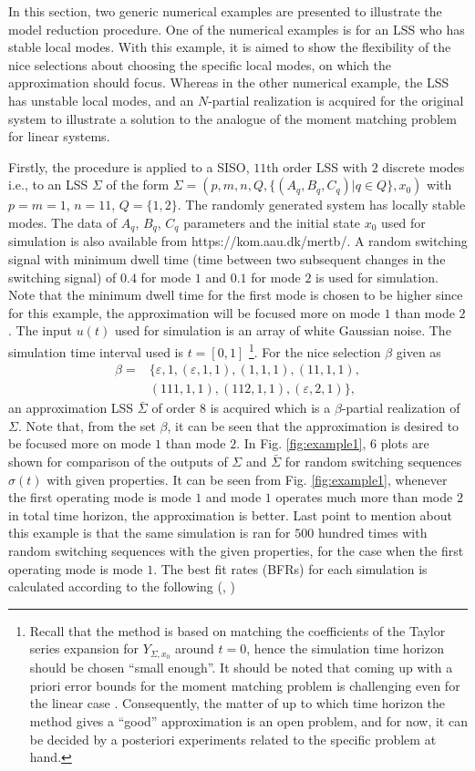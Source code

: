 \documentclass[journal]{IEEEtran}
\begin{document}
In this section, two generic numerical examples are presented to illustrate the model reduction procedure. One of the numerical examples is for an LSS who has stable local modes. With this example, it is aimed to show the flexibility of the nice selections about choosing the specific local modes, on which the approximation should focus. Whereas in the other numerical example, the LSS has unstable local modes, and an $N$-partial realization is acquired for the original system to illustrate a solution to the analogue of the moment matching problem for linear systems.

Firstly, the procedure is applied to a SISO, $11$th order LSS with $2$ discrete modes i.e., to an LSS $\Sigma$ of the form $\Sigma=(p,m,n,Q,\{(A_q,B_q,C_q)|q \in Q\},x_0)$ with $p=m=1$, $n=11$, $Q=\{1,2\}$. The randomly generated system has locally stable modes. The data of $A_q$, $B_q$, $C_q$ parameters and the initial state $x_0$ used for simulation is also available from https://kom.aau.dk/\texttildelow mertb/. A random switching signal with minimum dwell time (time between two subsequent changes in the switching signal) of $0.4$ for mode $1$ and $0.1$ for mode $2$ is used for simulation. Note that the minimum dwell time for the first mode is chosen to be higher since for this example, the approximation will be focused more on mode $1$ than mode $2$. The input $u(t)$ used for simulation is an array of white Gaussian noise. The simulation time interval used is $t=[0,1]$ \footnote{Recall that the method is based on matching the coefficients of the Taylor series expansion for $Y_{\Sigma,x_0}$ around $t=0$, hence the simulation time horizon should be chosen ``small enough''. It should be noted that coming up with a priori error bounds for the moment matching problem is challenging even for the linear case \cite{antoulas}. Consequently, the matter of up to which time horizon the method gives a ``good'' approximation is an open problem, and for now, it can be decided by a posteriori experiments related to the specific problem at hand.}. For the nice selection $\beta$ given as
\begin{align*}
	\beta= & \{ \varepsilon, 1, (\varepsilon,1,1), (1,1,1), (11,1,1), \\ 
	& (111,1,1), (112,1,1), (\varepsilon,2,1) \},
\end{align*}
an approximation LSS $\bar{\Sigma}$ of order $8$ is acquired which is a $\beta$-partial realization of $\Sigma$. Note that, from the set $\beta$, it can be seen that the approximation is desired to be focused more on mode $1$ than mode $2$. In Fig. \ref{fig:example1}, $6$ plots are shown for comparison of the outputs of $\Sigma$ and $\bar{\Sigma}$ for random switching sequences $\sigma(t)$ with given properties. It can be seen from Fig. \ref{fig:example1}, whenever the first operating mode is mode $1$ and mode $1$ operates much more than mode $2$ in total time horizon, the approximation is better. Last point to mention about this example is that the same simulation is ran for $500$ hundred times with random switching sequences with the given properties, for the case when the first operating mode is mode $1$. The best fit rates (BFRs) for each simulation is calculated according to the following (\cite{ljung}, \cite{toth2012})
\end{document}
